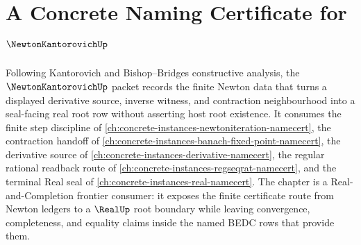 \chapter{A Concrete Naming Certificate for $\NewtonKantorovichUp$}
\label{ch:concrete-instances-newton-kantorovich-namecert}

Following Kantorovich and Bishop--Bridges constructive analysis, the $\NewtonKantorovichUp$ packet records the finite Newton data that turns a displayed derivative source, inverse witness, and contraction neighbourhood into a seal-facing real root row without asserting host root existence. It consumes the finite step discipline of \autoref{ch:concrete-instances-newtoniteration-namecert}, the contraction handoff of \autoref{ch:concrete-instances-banach-fixed-point-namecert}, the derivative source of \autoref{ch:concrete-instances-derivative-namecert}, the regular rational readback route of \autoref{ch:concrete-instances-regseqrat-namecert}, and the terminal Real seal of \autoref{ch:concrete-instances-real-namecert}. The chapter is a Real-and-Completion frontier consumer: it exposes the finite certificate route from Newton ledgers to a $\RealUp$ root boundary while leaving convergence, completeness, and equality claims inside the named BEDC rows that provide them.

